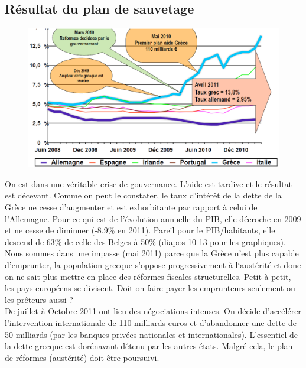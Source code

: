 \subsection{Résultat du plan de sauvetage}
\begin{figure}
\includegraphics[scale=0.3]{39}
\end{figure}
\noindent On est dans une véritable crise de gouvernance. L'aide est tardive et le résultat est décevant. Comme on peut le constater, le taux d'intérêt de la dette de la Grèce ne cesse d'augmenter et est exhorbitante par rapport à celui de l'Allemagne. Pour ce qui est de l'évolution annuelle du PIB, elle décroche en 2009 et ne cesse de diminuer (-8.9\% en 2011). Pareil pour le PIB/habitants, elle descend de 63\% de celle des Belges à 50\% (diapos 10-13 pour les graphiques).\\
Nous sommes dans une impasse (mai 2011) parce que la Grèce n’est plus capable d’emprunter, la population grecque s'oppose progressivement à l‘austérité et donc on ne sait plus mettre en place des réformes fiscales structurelles. Petit à petit, les pays européens se divisent. Doit-on faire payer les emprunteurs seulement ou les prêteurs aussi ?\\
De juillet à Octobre 2011 ont lieu des négociations intenses. On décide d'accélérer l’intervention internationale de 110 milliards euros et d'abandonner une dette de 50 milliards (par les banques privées nationales et internationales). L’essentiel de la dette grecque est dorénavant détenu par les autres états. Malgré cela, le plan de réformes (austérité) doit être poursuivi.

